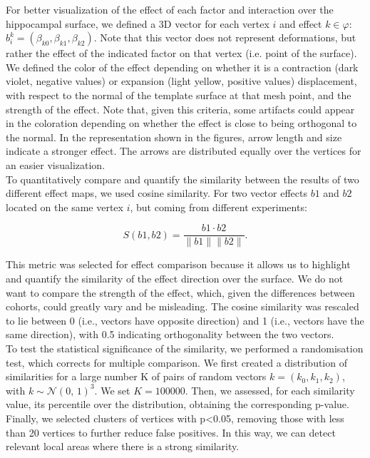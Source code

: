 For better visualization of the effect of each factor and interaction over the hippocampal surface, we defined a 3D vector for each vertex $i$ and effect $k \in \mathcal{\varphi}$: $b^k_{i} = (\beta_{k0}, \beta_{k1}, \beta_{k2}). $ Note that this vector does not represent deformations, but rather the effect of the indicated factor on that vertex (i.e. point of the surface). We defined the color of the effect depending on whether it is a contraction (dark violet, negative values) or expansion (light yellow, positive values) displacement, with respect to the normal of the template surface at that mesh point, and the strength of the effect. Note that, given this criteria, some artifacts could appear in the coloration depending on whether the effect is close to being orthogonal to the normal. In the representation shown in the figures, arrow length and size indicate a stronger effect. The arrows are distributed equally over the vertices for an easier visualization.  \\

To quantitatively compare and quantify the similarity between the results of two different effect maps, we used cosine similarity. For two vector effects $b1$ and $b2$ located on the same vertex $i$,  but coming from different experiments:

\begin{equation}
S(b1, b2) = \frac{b1\cdot b2}{\|b1\|\|b2\|}.
\end{equation}

This metric was selected for effect comparison because it allows us to highlight and quantify the similarity of the effect direction over the surface. We do not want to compare the strength of the effect, which, given the differences between cohorts, could greatly vary and be misleading. The cosine similarity was rescaled to lie between 0 (i.e., vectors have opposite direction) and 1 (i.e., vectors have the same direction), with 0.5 indicating orthogonality between the two vectors. \\

To test the statistical significance of the similarity, we performed a randomisation test, which corrects for multiple comparison. We first created a distribution of similarities for a large number K of pairs of random vectors $k = (k_0, k_1, k_2)$, with $k \sim \mathcal{N}(0,\,1)^3$. We set $K=100000$. Then, we assessed, for each similarity value, its percentile over the distribution, obtaining the corresponding p-value. Finally, we selected clusters of vertices with p<0.05, removing those with less than 20 vertices to further reduce false positives. In this way, we can detect relevant local areas where there is a strong similarity. \\

